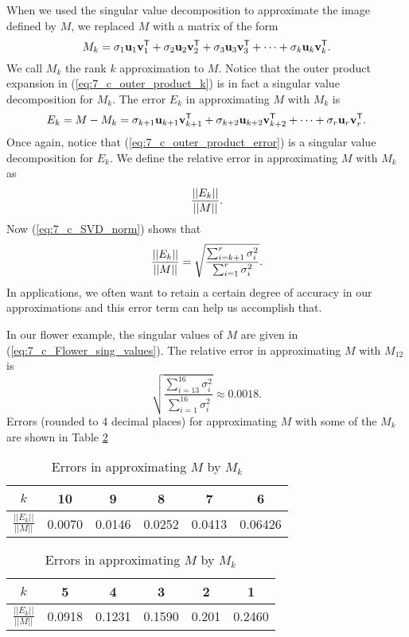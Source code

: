 When we used the singular value decomposition to approximate the image defined by $M$, we replaced $M$ with a matrix of the form
\begin{equation}
M_k = \sigma_1 \mathbf{u}_1\mathbf{v}_1^{\mathsf{T}} + \sigma_2 \mathbf{u}_2\mathbf{v}_2^{\mathsf{T}} + \sigma_3 \mathbf{u}_3\mathbf{v}_3^{\mathsf{T}} + \cdots + \sigma_{k} \mathbf{u}_{k}\mathbf{v}_{k}^{\mathsf{T}}. \label{eq:7_c_outer_product_k}
\end{equation}
We call $M_k$ the rank $k$ approximation to $M$. Notice that the outer product expansion in (\ref{eq:7_c_outer_product_k}) is in fact a singular value decomposition for $M_k$. The error $E_k$ in approximating $M$ with $M_k$ is
\begin{equation}
E_k = M - M_k = \sigma_{k+1} \mathbf{u}_{k+1}\mathbf{v}_{k+1}^{\mathsf{T}} + \sigma_{k+2} \mathbf{u}_{k+2}\mathbf{v}_{k+2}^{\mathsf{T}} + \cdots + \sigma_{r} \mathbf{u}_{r}\mathbf{v}_{r}^{\mathsf{T}}. \label{eq:7_c_outer_product_error}
\end{equation}
Once again, notice that (\ref{eq:7_c_outer_product_error}) is a singular value decomposition for $E_k$. We define the relative error in approximating $M$ with $M_k$ as
\[\displaystyle \frac{||E_k||}{||M||}.\]
Now (\ref{eq:7_c_SVD_norm}) shows that
\[\displaystyle \frac{||E_k||}{||M||} = \sqrt{ \frac{\sum_{i=k+1}^r \sigma_i^2}{\sum_{i=1}^r \sigma_i^2} }.\]
In applications, we often want to retain a certain degree of accuracy in our approximations and this error term can help us accomplish that.

In our flower example, the singular values of $M$ are given in (\ref{eq:7_c_Flower_sing_values}). The relative error in approximating $M$ with $M_{12}$ is
\[\sqrt{ \frac{\sum_{i=13}^{16} \sigma_i^2}{\sum_{i=1}^{16} \sigma_i^2} } \approx 0.0018.\]
Errors (rounded to 4 decimal places) for approximating $M$ with some of the $M_k$ are shown in Table \ref{T:7_c_Errors}
\begin{table}[h]
\begin{center}
\begin{tabular}{|c|c|c|c|c|c|} \hline
$k$	&10 & 9 & 8 & 7 & 6  \\ \hline
$\frac{||E_k||}{||M||}$ &0.0070 &0.0146 &0.0252 &0.0413 &0.06426 \\ \hline
\end{tabular} \vspace{4pt}
\begin{tabular}{|c|c|c|c|c|c|} \hline
$k$	&5 & 4 &3 & 2 & 1  \\ \hline
$\frac{||E_k||}{||M||}$ &0.0918 &0.1231 &0.1590 &0.201 &0.2460 \\ \hline
\end{tabular}
\caption{ Errors in approximating $M$ by $M_k$}
\label{T:7_c_Errors}
\end{center}
\end{table}



